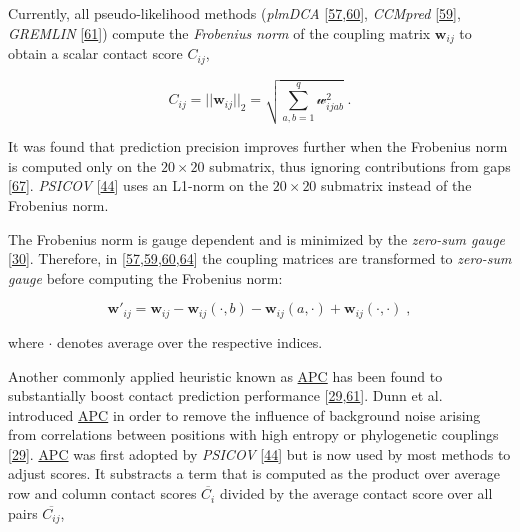 \documentclass[12pt,a4paper,twoside]{book}
\newcommand{\w}{\mathbf{w}}
\newcommand{\wij}{\mathbf{w}_{ij}}
\newcommand{\wijab}{\mathcal{w}_{ijab}}
\theoremstyle{definition}
\theoremstyle{definition}
\theoremstyle{remark}
\begin{document}
Currently, all pseudo-likelihood methods (\emph{plmDCA}
{[}\protect\hyperlink{ref-Ekeberg2013}{57},\protect\hyperlink{ref-Ekeberg2014}{60}{]},
\emph{CCMpred} {[}\protect\hyperlink{ref-Seemayer2014}{59}{]},
\emph{GREMLIN} {[}\protect\hyperlink{ref-Kamisetty2013}{61}{]}) compute
the \emph{Frobenius norm} of the coupling matrix \(\wij\) to obtain a
scalar contact score \(C_{ij}\),

\begin{equation}
    C_{ij}  = ||\wij||_2 = \sqrt{\sum_{a,b=1}^q \wijab^2} \; .
\label{eq:frobenius-norm}
\end{equation}

It was found that prediction precision improves further when the
Frobenius norm is computed only on the \(20 \times 20\) submatrix, thus
ignoring contributions from gaps
{[}\protect\hyperlink{ref-Feinauer2014}{67}{]}. \emph{PSICOV}
{[}\protect\hyperlink{ref-Jones2012}{44}{]} uses an L1-norm on the
\(20 \times 20\) submatrix instead of the Frobenius norm.

The Frobenius norm is gauge dependent and is minimized by the
\emph{zero-sum gauge} {[}\protect\hyperlink{ref-Weigt2009}{30}{]}.
Therefore, in
{[}\protect\hyperlink{ref-Ekeberg2013}{57},\protect\hyperlink{ref-Seemayer2014}{59},\protect\hyperlink{ref-Ekeberg2014}{60},\protect\hyperlink{ref-Baldassi2014}{64}{]}
the coupling matrices are transformed to \emph{zero-sum gauge} before
computing the Frobenius norm:

\begin{equation}
    \w\prime_{ij}  = \wij - \wij(\cdot, b) - \wij(a, \cdot) + \wij(\cdot, \cdot) \; ,
\label{eq:zero-sum-gauge-transform}
\end{equation}

where \(\cdot\) denotes average over the respective indices.

Another commonly applied heuristic known as
\protect\hyperlink{abbrev}{APC} has been found to substantially boost
contact prediction performance
{[}\protect\hyperlink{ref-Dunn2008}{29},\protect\hyperlink{ref-Kamisetty2013}{61}{]}.
Dunn et al. introduced \protect\hyperlink{abbrev}{APC} in order to
remove the influence of background noise arising from correlations
between positions with high entropy or phylogenetic couplings
{[}\protect\hyperlink{ref-Dunn2008}{29}{]}.
\protect\hyperlink{abbrev}{APC} was first adopted by \emph{PSICOV}
{[}\protect\hyperlink{ref-Jones2012}{44}{]} but is now used by most
methods to adjust scores. It substracts a term that is computed as the
product over average row and column contact scores \(\overline{C_i}\)
divided by the average contact score over all pairs
\(\overline{C_{ij}}\),
\end{document}
